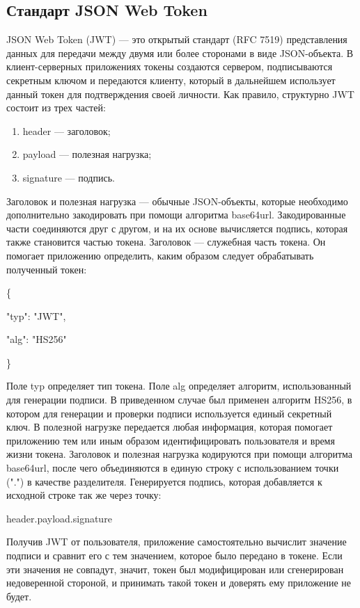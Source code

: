 \subsection{Стандарт JSON Web Token}
JSON Web Token (JWT) — это открытый стандарт (RFC 7519) представления данных для передачи между двумя или более сторонами в виде JSON-объекта. В клиент-серверных приложениях токены создаются сервером, подписываются секретным ключом и передаются клиенту, который в дальнейшем использует данный токен для подтверждения своей личности. Как правило, структурно JWT состоит из трех частей: 
\begin{enumerate}
	\item header — заголовок;
	\item payload — полезная нагрузка;
	\item signature — подпись.
\end{enumerate}
Заголовок и полезная нагрузка — обычные JSON-объекты, которые необходимо дополнительно закодировать при помощи алгоритма base64url. Закодированные части соединяются друг с другом, и на их основе вычисляется подпись, которая также становится частью токена. 
Заголовок — служебная часть токена. Он помогает приложению определить, каким образом следует обрабатывать полученный токен:

\{

	"typ": "JWT",
	
	"alg": "HS256"
	
\}


Поле typ определяет тип токена. Поле alg определяет алгоритм, использованный для генерации подписи. В приведенном случае был применен алгоритм HS256, в котором для генерации и проверки подписи используется единый секретный ключ. В полезной нагрузке передается любая информация, которая помогает приложению тем или иным образом идентифицировать пользователя и время жизни токена. Заголовок и полезная нагрузка кодируются при помощи алгоритма base64url, после чего объединяются в единую строку с использованием точки (".") в качестве разделителя. Генерируется подпись, которая добавляется к исходной строке так же через точку:
\begin{center}
header.payload.signature
\end{center}

Получив JWT от пользователя, приложение самостоятельно вычислит значение подписи и сравнит его с тем значением, которое было передано в токене. Если эти значения не совпадут, значит, токен был модифицирован или сгенерирован недоверенной стороной, и принимать такой токен и доверять ему приложение не будет. 


